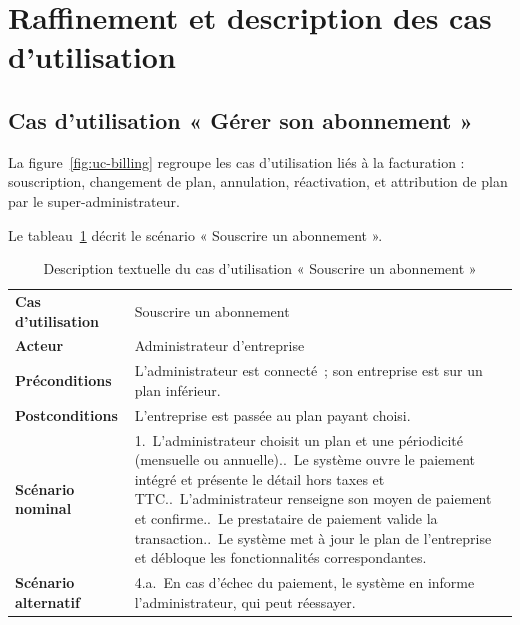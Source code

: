 \section{Raffinement et description des cas d'utilisation}

\subsection{Cas d'utilisation « Gérer son abonnement »}
La figure~\ref{fig:uc-billing} regroupe les cas d'utilisation liés à la
facturation : souscription, changement de plan, annulation, réactivation, et
attribution de plan par le super-administrateur.


Le tableau~\ref{tab:uc-subscribe} décrit le scénario « Souscrire un
abonnement ».

\begin{table}[H]
\centering
\caption{Description textuelle du cas d'utilisation « Souscrire un abonnement »}
\label{tab:uc-subscribe}
\small
\begin{tabularx}{\linewidth}{lX}
\toprule
\textbf{Cas d'utilisation} & Souscrire un abonnement \\
\textbf{Acteur} & Administrateur d'entreprise \\
\textbf{Préconditions} & L'administrateur est connecté~; son entreprise est sur un plan inférieur. \\
\textbf{Postconditions} & L'entreprise est passée au plan payant choisi. \\
\midrule
\textbf{Scénario nominal} &
1.~L'administrateur choisit un plan et une périodicité (mensuelle ou annuelle).\newline
2.~Le système ouvre le paiement intégré et présente le détail hors taxes et TTC.\newline
3.~L'administrateur renseigne son moyen de paiement et confirme.\newline
4.~Le prestataire de paiement valide la transaction.\newline
5.~Le système met à jour le plan de l'entreprise et débloque les fonctionnalités correspondantes. \\
\midrule
\textbf{Scénario alternatif} &
4.a.~En cas d'échec du paiement, le système en informe l'administrateur, qui peut réessayer. \\
\bottomrule
\end{tabularx}
\end{table}

